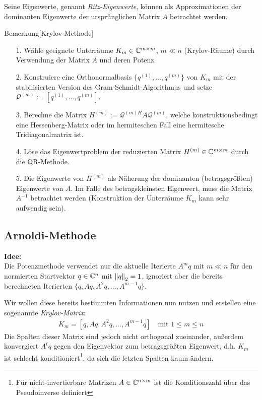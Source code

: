 Seine Eigenwerte, genannt \textit{Ritz-Eigenwerte}, können als Approximationen der dominanten Eigenwerte der 
ursprünglichen Matrix $A$ betrachtet werden. 

\begin{colbox}{Bemerkung}[Krylov-Methode] 
  \begin{enumerate}
    \item[1.] Wähle geeignete Unterräume $K_m\in\mathbb C  ^{m\times m}$, $m\ll n$ (Krylov-Räume) durch Verwendung der 
    Matrix $A$ und deren Potenz.
    \item[2.] Konstruiere eine Orthonormalbasis $\{q^{(1)},\dots, q^{(m)}\}$ von $K_m$ mit der stabilisierten 
    Version des Gram-Schmidt-Algorithmus und setze $\mathcal{Q}^{(m)}:=[q^{(1)},\dots,q^{(m)}]$.
    \item[3.] Berechne die Matrix $H^{(m)}:=\mathcal{Q}^{(m)H}A\mathcal{Q}^{(m)}$, welche 
    konstruktionsbedingt eine Hessenberg-Matrix oder im hermiteschen Fall eine hermitesche Tridiagonalmatrix ist. 
    \item[4.] Löse das Eigenwertproblem der reduzierten Matrix $H^{(m)}\in\mathbb C^{m\times m}$ durch die 
    QR-Methode.
    \item[5.] Die Eigenwerte von $H^{(m)}$ als Näherung der dominanten (betragsgrößten) Eigenwerte 
    von $A$. Im Falle des betragskleinsten Eigenwert, muss die Matrix $A^{-1}$ betrachtet werden (Konstruktion 
    der Unterräume $K_m$ kann sehr aufwendig sein).
  \end{enumerate}
\end{colbox}

\subsection{Arnoldi-Methode}
\textbf{Idee:} \\
Die Potenzmethode verwendet nur die aktuelle Iterierte $A^mq$ mit $m\ll n$ für den normierten Startvektor 
$q\in\mathbb C^n$ mit $\vertn{2}{q}_2=1$, ignoriert aber die bereits berechneten Iterierten $\{q,Aq,A^2q,\dots,A^{m-1}q\}$.

Wir wollen diese bereits bestimmten Informationen nun nutzen und erstellen eine sogenannte \textit{Krylov-Matrix}:
%
\begin{align*}
  K_m = [q,Aq,A^2q,\dots,A^{m-1}q]
  \quad\text{mit }1\leq m\leq n
\end{align*}
%
Die Spalten dieser Matrix sind jedoch nicht orthogonal zueinander, außerdem konvergiert $A^tq$ gegen den 
Eigenvektor zum betragsgrößten Eigenwert, d.h. $K_m$ ist schlecht konditioniert\footnote{
  Für nicht-invertierbare Matrizen $A\in\mathbb C^{n\times m}$ ist die Konditionszahl über das Pseudoinverse definiert
}, da sich die letzten Spalten kaum ändern. 

